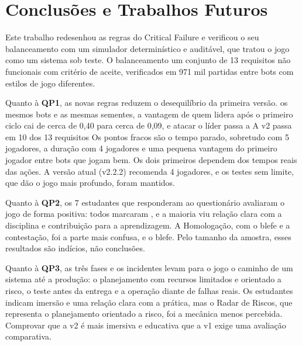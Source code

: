\section{Conclusões e Trabalhos Futuros}
\label{sec:conclusoes}

Este trabalho redesenhou as regras do Critical Failure e verificou o seu balanceamento com um simulador
determinístico e auditável, que tratou o jogo como um sistema sob teste. O balanceamento  um conjunto de 13
requisitos não funcionais com critério de aceite, verificados em 971 mil partidas entre bots com estilos de jogo
diferentes.

Quanto à \textbf{QP1}, as novas regras reduzem o desequilíbrio da primeira versão. 
os mesmos bots e as mesmas sementes, a vantagem de quem lidera após o primeiro ciclo cai de cerca de 0,40 para
cerca de 0,09, e atacar o líder passa a  A v2 passa em 10 dos 13
requisitos Os pontos fracos são o tempo
parado, sobretudo com 5 jogadores, a duração com 4 jogadores e uma
pequena vantagem do primeiro jogador entre bots que jogam bem. Os dois primeiros dependem dos tempos reais das
ações. A versão atual (v2.2.2) recomenda 4 jogadores, e os testes sem limite, que dão o jogo mais profundo, foram
mantidos.

Quanto à \textbf{QP2}, os 7 estudantes que responderam ao questionário avaliaram o jogo de forma positiva: todos
marcaram , e a maioria
viu relação clara com a disciplina e contribuição para a aprendizagem. A Homologação, com o blefe e a
contestação, foi a parte mais confusa, e  o blefe. Pelo
tamanho da amostra, esses resultados são indícios, não conclusões.

Quanto à \textbf{QP3}, as três fases e os incidentes levam para o jogo o caminho de um sistema até a produção: o
planejamento com recursos limitados e orientado a risco, o teste antes da entrega e a operação diante de falhas
reais. Os estudantes indicam imersão e uma relação clara com a prática, mas o Radar de Riscos, que representa o
planejamento orientado a risco, foi a mecânica menos percebida. Comprovar que a v2 é mais imersiva e educativa que
a v1 exige uma avaliação comparativa.

